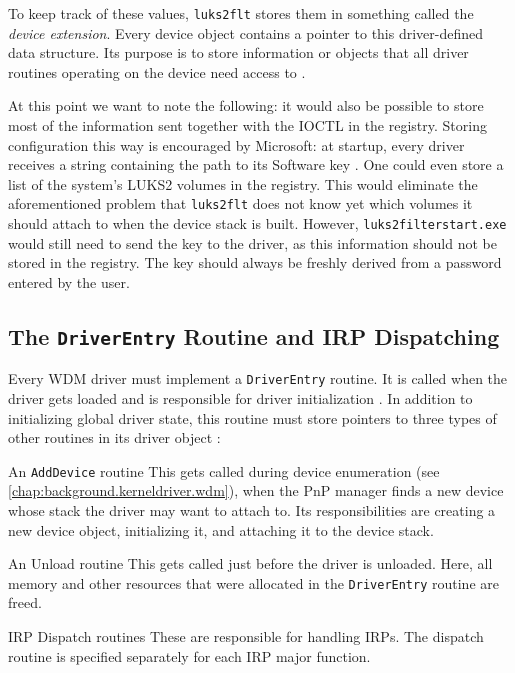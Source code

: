 To keep track of these values, \texttt{luks2flt} stores them in something called the \emph{device extension}. Every device object contains a pointer to this driver-defined data structure. Its purpose is to store information or objects that all driver routines operating on the device need access to \cite{Kerneldriver}.

At this point we want to note the following: it would also be possible to store most of the information sent together with the IOCTL in the registry. Storing configuration this way is encouraged by Microsoft: at startup, every driver receives a string containing the path to its Software key \cite{Wdk}. One could even store a list of the system's LUKS2 volumes in the registry. This would eliminate the aforementioned problem that \texttt{luks2flt} does not know yet which volumes it should attach to when the device stack is built. However, \texttt{luks2filterstart.exe} would still need to send the key to the driver, as this information should not be stored in the registry. The key should always be freshly derived from a password entered by the user.

\subsection{The \texttt{DriverEntry} Routine and IRP Dispatching}
\label{chap:ourapproach.final.genericdispatch}
Every WDM driver must implement a \texttt{DriverEntry} routine. It is called when the driver gets loaded and is responsible for driver initialization \cite{Wdk}. In addition to initializing global driver state, this routine must store pointers to three types of other routines in its driver object \cite{Kerneldriver}:
\begin{descitemize}
	\item[An \texttt{AddDevice} routine] This gets called during device enumeration (see \autoref{chap:background.kerneldriver.wdm}), when the PnP manager finds a new device whose stack the driver may want to attach to. Its responsibilities are creating a new device object, initializing it, and attaching it to the device stack.
	\item[An Unload routine] This gets called just before the driver is unloaded. Here, all memory and other resources that were allocated in the \texttt{DriverEntry} routine are freed.
	\item[IRP Dispatch routines] These are responsible for handling IRPs. The dispatch routine is specified separately for each IRP major function.
\end{descitemize}

